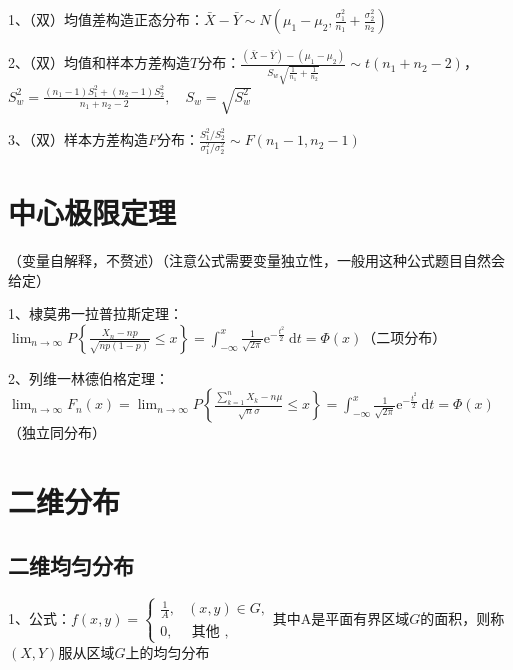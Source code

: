 1、（双）均值差构造正态分布：$ \bar{X}-\bar{Y} \sim N\left(\mu_{1}-\mu_{2}, \frac{\sigma_{1}^{2}}{n_{1}}+\frac{\sigma_{2}^{2}}{n_{2}}\right) $

2、（双）均值和样本方差构造$ T $分布：$ \frac{(\bar{X}-\bar{Y})-\left(\mu_{1}-\mu_{2}\right)}{S_{w} \sqrt{\frac{1}{n_{1}}+\frac{1}{n_{2}}}} \sim t\left(n_{1}+n_{2}-2\right) $，$ S_{w}^{2}=\frac{\left(n_{1}-1\right) S_{1}^{2}+\left(n_{2}-1\right) S_{2}^{2}}{n_{1}+n_{2}-2}, \quad S_{w}=\sqrt{S_{w}^{2}} $

3、（双）样本方差构造$ F $分布：$ \frac{S_{1}^{2} / S_{2}^{2}}{\sigma_{1}^{2} / \sigma_{2}^{2}} \sim F\left(n_{1}-1, n_{2}-1\right) $

\section{中心极限定理}

（变量自解释，不赘述）（注意公式需要变量独立性，一般用这种公式题目自然会给定）

1、棣莫弗一拉普拉斯定理：$ \lim _{n \rightarrow \infty} P\left\{\frac{X_{n}-n p}{\sqrt{n p(1-p)}} \leqslant x\right\}=\int_{-\infty}^{x} \frac{1}{\sqrt{2 \pi}} \mathrm{e}^{-\frac{t^{2}}{2}} \mathrm{~d} t=\Phi(x) $（二项分布）

2、列维一林德伯格定理：$ \lim_{n \rightarrow \infty} F_{n}(x)=\lim_{n \rightarrow \infty} P\left\{\frac{\sum_{k=1}^{n} X_{k}-n \mu}{\sqrt{n} \sigma} \leqslant x\right\}=\int_{-\infty}^{x} \frac{1}{\sqrt{2 \pi}} \mathrm{e}^{-\frac{t^{2}}{2}} \mathrm{~d} t=\Phi(x) $（独立同分布）

\section{二维分布}



\subsection{二维均匀分布}

1、公式：$ f(x, y)=\left\{\begin{array}{lc}

\frac{1}{A}, & (x, y) \in G, \\

0, & \text { 其他 },

\end{array}\right. $其中A是平面有界区域$ G $的面积，则称$ (X,Y) $服从区域$ G $上的均匀分布



